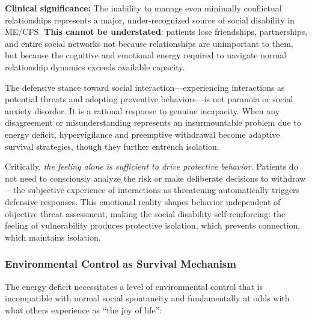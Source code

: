 \textbf{Clinical significance:} The inability to manage even minimally conflictual relationships represents a major, under-recognized source of social disability in ME/CFS. \textbf{This cannot be understated}: patients lose friendships, partnerships, and entire social networks not because relationships are unimportant to them, but because the cognitive and emotional energy required to navigate normal relationship dynamics exceeds available capacity.

The defensive stance toward social interaction---experiencing interactions as potential threats and adopting preventive behaviors---is not paranoia or social anxiety disorder. It is a rational response to genuine incapacity. When any disagreement or misunderstanding represents an insurmountable problem due to energy deficit, hypervigilance and preemptive withdrawal become adaptive survival strategies, though they further entrench isolation.

Critically, \textit{the feeling alone is sufficient to drive protective behavior}. Patients do not need to consciously analyze the risk or make deliberate decisions to withdraw---the subjective experience of interactions as threatening automatically triggers defensive responses. This emotional reality shapes behavior independent of objective threat assessment, making the social disability self-reinforcing: the feeling of vulnerability produces protective isolation, which prevents connection, which maintains isolation.

\subsubsection{Environmental Control as Survival Mechanism}

The energy deficit necessitates a level of environmental control that is incompatible with normal social spontaneity and fundamentally at odds with what others experience as ``the joy of life'':

